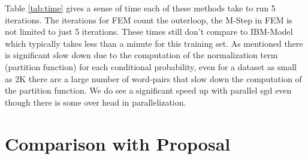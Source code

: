 \documentclass[11pt,letterpaper]{article}
\begin{document}
Table \ref{tab:time} gives a sense of time each of these methods take to run 5 iterations. The iterations for FEM count the outerloop, the M-Step in FEM is not limited to just 5 iterations. These times still don't compare to IBM-Model which typically takes less than a minute for this training set. As mentioned there is significant slow down due to the computation of the normalization term (partition function) for each conditional probability, even for a dataset as small as 2K there are a large number of word-pairs that slow down the computation of the partition function. We do see a significant speed up with parallel sgd even though there is some over head in parallelization.
\begin{table}[h]
\centering
{}
\caption{\label{tab:time} Time of the algorithms with 5 iterations 2K sentences and tested on 200, only with base features}
\end{table}

\begin{table}[h]
\centering
{}
\caption{\label{tab:sgdp} Performance FEM-SGD-P trained on 5K sentences (5 iterations) and tested on 200}
\end{table}
\section{Comparison with Proposal}


\end{document}
